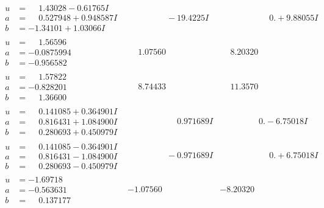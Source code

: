\documentclass[1p]{elsarticle_modified}
\theoremstyle{definition}
\begin{document}
$$\begin{array}{c|c|c}
\begin{aligned}
u &= \phantom{-}1.43028 - 0.61765 I \\
a &= \phantom{-}0.527948 + 0.948587 I \\
b &= -1.34101 + 1.03066 I\end{aligned}
 & \phantom{-0.000000 } -19.4225 I & \phantom{-0.000000 -}0. + 9.88055 I \\ \hline\begin{aligned}
u &= \phantom{-}1.56596\phantom{ +0.000000I} \\
a &= -0.0875994\phantom{ +0.000000I} \\
b &= -0.956582\phantom{ +0.000000I}\end{aligned}
 & \phantom{-}1.07560\phantom{ +0.000000I} & \phantom{-}8.20320\phantom{ +0.000000I} \\ \hline\begin{aligned}
u &= \phantom{-}1.57822\phantom{ +0.000000I} \\
a &= -0.828201\phantom{ +0.000000I} \\
b &= \phantom{-}1.36600\phantom{ +0.000000I}\end{aligned}
 & \phantom{-}8.74433\phantom{ +0.000000I} & \phantom{-}11.3570\phantom{ +0.000000I} \\ \hline\begin{aligned}
u &= \phantom{-}0.141085 + 0.364901 I \\
a &= \phantom{-}0.816431 + 1.084900 I \\
b &= \phantom{-}0.280693 + 0.450979 I\end{aligned}
 & \phantom{-0.000000 -}0.971689 I & \phantom{-0.000000 } 0. - 6.75018 I \\ \hline\begin{aligned}
u &= \phantom{-}0.141085 - 0.364901 I \\
a &= \phantom{-}0.816431 - 1.084900 I \\
b &= \phantom{-}0.280693 - 0.450979 I\end{aligned}
 & \phantom{-0.000000 } -0.971689 I & \phantom{-0.000000 -}0. + 6.75018 I \\ \hline\begin{aligned}
u &= -1.69718\phantom{ +0.000000I} \\
a &= -0.563631\phantom{ +0.000000I} \\
b &= \phantom{-}0.137177\phantom{ +0.000000I}\end{aligned}
 & -1.07560\phantom{ +0.000000I} & -8.20320\phantom{ +0.000000I} \\ \hline\begin{aligned}

\end{aligned}
\end{array}$$
\end{document}
